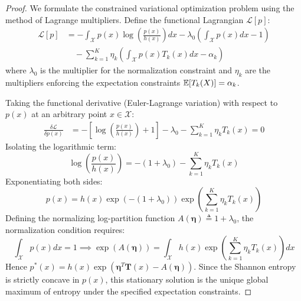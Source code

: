 \begin{proof}
We formulate the constrained variational optimization problem using the method of Lagrange multipliers. Define the functional Lagrangian $\mathcal{L}[p]$:
\begin{align}
\mathcal{L}[p] &= -\int_{\mathcal{X}} p(x) \log\left(\frac{p(x)}{h(x)}\right) dx - \lambda_0 \left( \int_{\mathcal{X}} p(x) dx - 1 \right) \nonumber \\
&\quad - \sum_{k=1}^K \eta_k \left( \int_{\mathcal{X}} p(x) T_k(x) dx - \alpha_k \right)
\end{align}
where $\lambda_0$ is the multiplier for the normalization constraint and $\eta_k$ are the multipliers enforcing the expectation constraints $\operatorname{\mathbb{E}}[T_k(X)] = \alpha_k$.

Taking the functional derivative (Euler-Lagrange variation) with respect to $p(x)$ at an arbitrary point $x \in \mathcal{X}$:
\begin{align}
\frac{\delta \mathcal{L}}{\delta p(x)} &= -\left[ \log\left(\frac{p(x)}{h(x)}\right) + 1 \right] - \lambda_0 - \sum_{k=1}^K \eta_k T_k(x) = 0
\end{align}
Isolating the logarithmic term:
\begin{equation}
\log\left(\frac{p(x)}{h(x)}\right) = -(1 + \lambda_0) - \sum_{k=1}^K \eta_k T_k(x)
\end{equation}
Exponentiating both sides:
\begin{equation}
p(x) = h(x) \exp\left( -(1 + \lambda_0) \right) \exp\left( \sum_{k=1}^K \eta_k T_k(x) \right)
\end{equation}
Defining the normalizing log-partition function $A(\boldsymbol{\eta}) \triangleq 1 + \lambda_0$, the normalization condition requires:
\begin{equation}
\int_{\mathcal{X}} p(x) dx = 1 \implies \exp(A(\boldsymbol{\eta})) = \int_{\mathcal{X}} h(x) \exp\left( \sum_{k=1}^K \eta_k T_k(x) \right) dx
\end{equation}
Hence $p^*(x) = h(x) \exp\left( \boldsymbol{\eta}^T \mathbf{T}(x) - A(\boldsymbol{\eta}) \right)$. Since the Shannon entropy is strictly concave in $p(x)$, this stationary solution is the unique global maximum of entropy under the specified expectation constraints.
\end{proof}


